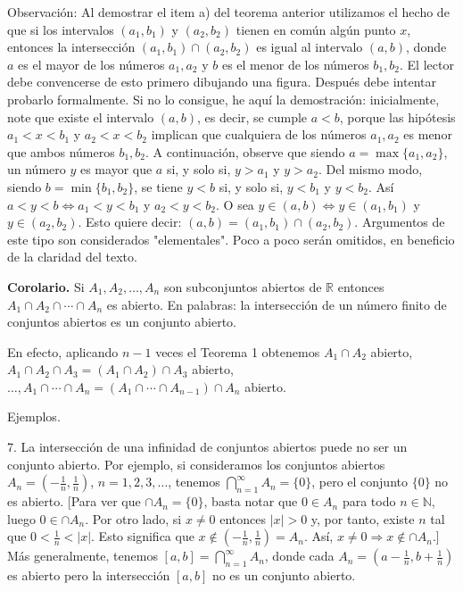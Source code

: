 \documentclass[12pt,oneside]{book}
\begin{document}
Observación: Al demostrar el item a) del teorema anterior utilizamos el hecho de que si los intervalos \((a_1, b_1)\) y \((a_2, b_2)\) tienen en común algún punto \(x\), entonces la intersección \((a_1, b_1) \cap (a_2, b_2)\) es igual al intervalo \((a, b)\), donde \(a\) es el mayor de los números \(a_1, a_2\) y \(b\) es el menor de los números \(b_1, b_2\). El lector debe convencerse de esto primero dibujando una figura. Después debe intentar probarlo formalmente. Si no lo consigue, he aquí la demostración: inicialmente, note que existe el intervalo \((a, b)\), es decir, se cumple \(a < b\), porque las hipótesis \(a_1 < x < b_1\) y \(a_2 < x < b_2\) implican que cualquiera de los números \(a_1, a_2\) es menor que ambos números \(b_1, b_2\). A continuación, observe que siendo \(a = \max\{a_1, a_2\}\), un número \(y\) es mayor que \(a\) si, y solo si, \(y > a_1\) y \(y > a_2\). Del mismo modo, siendo \(b = \min\{b_1, b_2\}\), se tiene \(y < b\) si, y solo si, \(y < b_1\) y \(y < b_2\). Así \(a < y < b \Leftrightarrow a_1 < y < b_1\) y \(a_2 < y < b_2\). O sea \(y \in (a, b) \Leftrightarrow y \in (a_1, b_1)\) y \(y \in (a_2, b_2)\). Esto quiere decir: \((a, b) = (a_1, b_1) \cap (a_2, b_2)\). Argumentos de este tipo son considerados "elementales". Poco a poco serán omitidos, en beneficio de la claridad del texto.

\textbf{Corolario.} Si \(A_1, A_2, \ldots, A_n\) son subconjuntos abiertos de \(\mathbb{R}\) entonces \(A_1 \cap A_2 \cap \cdots \cap A_n\) es abierto. En palabras: la intersección de un número finito de conjuntos abiertos es un conjunto abierto.

En efecto, aplicando \(n-1\) veces el Teorema 1 obtenemos \(A_1 \cap A_2\) abierto, \(A_1 \cap A_2 \cap A_3 = (A_1 \cap A_2) \cap A_3\) abierto, \(\ldots, A_1 \cap \cdots \cap A_n = (A_1 \cap \cdots \cap A_{n-1}) \cap A_n\) abierto.

Ejemplos.

7. La intersección de una infinidad de conjuntos abiertos puede no ser un conjunto abierto. Por ejemplo, si consideramos los conjuntos abiertos \(A_n = \left(-\frac{1}{n}, \frac{1}{n}\right)\), \(n = 1, 2, 3, \ldots\), tenemos \(\bigcap_{n=1}^\infty A_n = \{0\}\), pero el conjunto \(\{0\}\) no es abierto. [Para ver que \(\cap A_n = \{0\}\), basta notar que \(0 \in A_n\) para todo \(n \in \mathbb{N}\), luego \(0 \in \cap A_n\). Por otro lado, si \(x \neq 0\) entonces \(|x| > 0\) y, por tanto, existe \(n\) tal que \(0 < \frac{1}{n} < |x|\). Esto significa que \(x \notin \left(-\frac{1}{n}, \frac{1}{n}\right) = A_n\). Así, \(x \neq 0 \Rightarrow x \notin \cap A_n\).] Más generalmente, tenemos \([a, b] = \bigcap_{n=1}^\infty A_n\), donde cada \(A_n = \left(a - \frac{1}{n}, b + \frac{1}{n}\right)\) es abierto pero la intersección \([a, b]\) no es un conjunto abierto.
\end{document}

